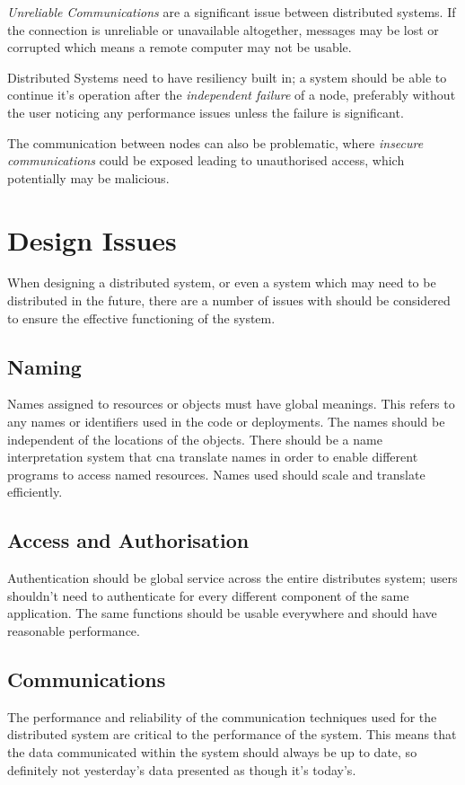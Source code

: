 \textit{Unreliable Communications} are a significant issue between distributed systems. If the connection is unreliable or unavailable altogether, messages may be lost or corrupted which means a remote computer may not be usable. 

Distributed Systems need to have resiliency built in; a system should be able to continue it's operation after the \textit{independent failure} of a node, preferably without the user noticing any performance issues unless the failure is significant.

The communication between nodes can also be problematic, where \textit{insecure communications} could be exposed leading to unauthorised access, which potentially may be malicious. 

\section{Design Issues}
When designing a distributed system, or even a system which may need to be distributed in the future, there are a number of issues with should be considered to ensure the effective functioning of the system.

\subsection{Naming}
Names assigned to resources or objects must have global meanings. This refers to any names or identifiers used in the code or deployments. The names should be independent of the locations of the objects. There should be a name interpretation system that cna translate names in order to enable different programs to access named resources. Names used should scale and translate efficiently. 

\subsection{Access and Authorisation}
Authentication should be global service across the entire distributes system; users shouldn't need to authenticate for every different component of the same application. The same functions should be usable everywhere and should have reasonable performance. 

\subsection{Communications}
The performance and reliability of the communication techniques used for the distributed system are critical to the performance of the system. This means that the data communicated within the system should always be up to date, so definitely not yesterday's data presented as though it's today's. 

